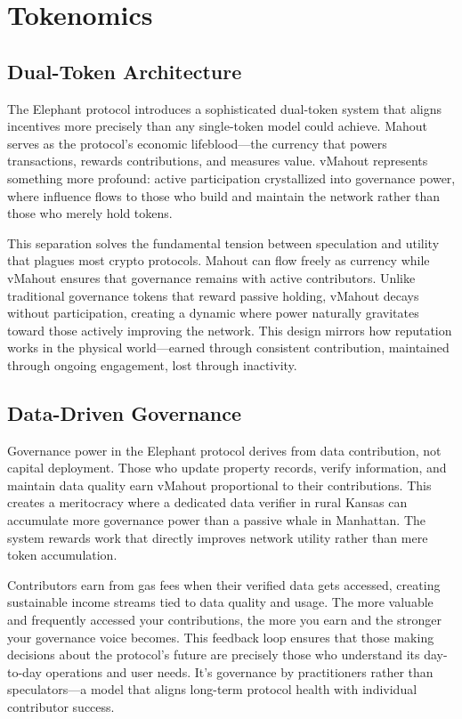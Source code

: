 \chapter{Tokenomics}

\section{Dual-Token Architecture}

The Elephant protocol introduces a sophisticated dual-token system that aligns incentives more precisely than any single-token model could achieve. Mahout serves as the protocol's economic lifeblood---the currency that powers transactions, rewards contributions, and measures value. vMahout represents something more profound: active participation crystallized into governance power, where influence flows to those who build and maintain the network rather than those who merely hold tokens.

This separation solves the fundamental tension between speculation and utility that plagues most crypto protocols. Mahout can flow freely as currency while vMahout ensures that governance remains with active contributors. Unlike traditional governance tokens that reward passive holding, vMahout decays without participation, creating a dynamic where power naturally gravitates toward those actively improving the network. This design mirrors how reputation works in the physical world---earned through consistent contribution, maintained through ongoing engagement, lost through inactivity.

\section{Data-Driven Governance}

Governance power in the Elephant protocol derives from data contribution, not capital deployment. Those who update property records, verify information, and maintain data quality earn vMahout proportional to their contributions. This creates a meritocracy where a dedicated data verifier in rural Kansas can accumulate more governance power than a passive whale in Manhattan. The system rewards work that directly improves network utility rather than mere token accumulation.

Contributors earn from gas fees when their verified data gets accessed, creating sustainable income streams tied to data quality and usage. The more valuable and frequently accessed your contributions, the more you earn and the stronger your governance voice becomes. This feedback loop ensures that those making decisions about the protocol's future are precisely those who understand its day-to-day operations and user needs. It's governance by practitioners rather than speculators---a model that aligns long-term protocol health with individual contributor success.


